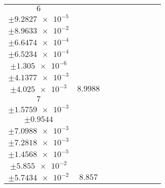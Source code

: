 \documentclass[8pt]{article}
\begin{document}
\begin{longtable}[l]{c c c c c c c c c}
$\num{6}$ & \begin{tabular}[c]{@{}c@{}}$\num{6.1006e-2}$ \\ $\pm\num{9.2827e-5}$\end{tabular} & \begin{tabular}[c]{@{}c@{}}$\num{0.51998}$ \\ $\pm\num{8.9633e-2}$\end{tabular} & \begin{tabular}[c]{@{}c@{}}$\num{7.0005}$ \\ $\pm\num{6.6474e-4}$\end{tabular} & \begin{tabular}[c]{@{}c@{}}$\num{1.5728e+3}$ \\ $\pm\num{6.5234e-4}$\end{tabular} & \begin{tabular}[c]{@{}c@{}}$\num{3.1465}$ \\ $\pm\num{1.305e-6}$\end{tabular} & \begin{tabular}[c]{@{}c@{}}$\num{2.4474}$ \\ $\pm\num{4.1377e-3}$\end{tabular} & \begin{tabular}[c]{@{}c@{}}$\num{2.3653}$ \\ $\pm\num{4.025e-3}$\end{tabular} & $\num{8.9988}$\\
$\num{7}$ & \begin{tabular}[c]{@{}c@{}}$\num{7.5188e-2}$ \\ $\pm\num{1.5759e-3}$\end{tabular} & \begin{tabular}[c]{@{}c@{}}$\num{-0.16496}$ \\ $\pm\num{0.9544}$\end{tabular} & \begin{tabular}[c]{@{}c@{}}$\num{-2.7654e-4}$ \\ $\pm\num{7.0988e-3}$\end{tabular} & \begin{tabular}[c]{@{}c@{}}$\num{1.5745e+3}$ \\ $\pm\num{7.2818e-3}$\end{tabular} & \begin{tabular}[c]{@{}c@{}}$\num{3.1499}$ \\ $\pm\num{1.4568e-5}$\end{tabular} & \begin{tabular}[c]{@{}c@{}}$\num{5.7786}$ \\ $\pm\num{5.855e-2}$\end{tabular} & \begin{tabular}[c]{@{}c@{}}$\num{5.6933}$ \\ $\pm\num{5.7434e-2}$\end{tabular} & $\num{8.857}$\\

\end{longtable}
\end{document}

